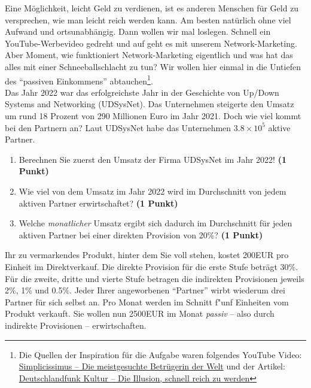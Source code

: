\documentclass[a4paper, 9pt]{scrartcl}\usepackage[]{graphicx}\usepackage[]{xcolor}
\begin{document}
Eine M{\"o}glichkeit, leicht Geld zu verdienen, ist es anderen Menschen f{\"u}r Geld
zu versprechen, wie man leicht reich werden kann. Am besten nat{\"u}rlich ohne
viel Aufwand und ortsunabh{\"a}ngig. Dann wollen wir mal loslegen. Schnell
ein YouTube-Werbevideo gedreht und auf geht es mit unserem
Network-Marketing. Aber Moment, wie funktioniert Network-Marketing
eigentlich und was hat das alles mit einer Schneeballschlacht zu tun? Wir
wollen hier einmal in die Untiefen des "`passiven Einkommens"'
abtauchen\footnote{Die Quellen der Inspiration f{\"u}r die Aufgabe waren
  folgendes YouTube Video:
  \href{https://youtu.be/UOKkZF_qK9M?si=uf4foJVFKfeQMwSw}{Simplicissimus --
    Die meistgesuchte Betr{\"u}gerin der Welt} und der Artikel:
  \href{https://www.deutschlandfunkkultur.de/netzwerk-marketing-die-illusion-schnell-reich-zu-werden-100.html}{
    Deutschlandfunk Kultur -- Die Illusion, schnell reich zu werden}}.\\

Das Jahr 2022 war das erfolgreichste Jahr in der Geschichte von
Up/Down Systems and Networking (UDSysNet). Das Unternehmen steigerte den Umsatz um rund
18 Prozent von 290 Millionen Euro im Jahr
2021. Doch wie viel kommt bei den Partnern an? Laut
UDSysNet habe das Unternehmen \ensuremath{3.8\times 10^{5}} aktive Partner.

\begin{enumerate}
\item Berechnen Sie zuerst den Umsatz der Firma UDSysNet im
  Jahr 2022! \textbf{(1 Punkt)}
\item Wie viel von dem Umsatz im Jahr 2022 wird im Durchschnitt von jedem
  aktiven Partner erwirtschaftet? \textbf{(1 Punkt)}
\item Welche \textit{monatlicher} Umsatz ergibt sich dadurch im
  Durchschnitt f{\"u}r jeden aktiven Partner bei einer direkten Provision von
  20\%? \textbf{(1 Punkt)}
\end{enumerate}

Ihr zu vermarkendes Produkt, hinter dem Sie voll stehen, kostet
200EUR pro Einheit im Direktverkauf. Die direkte Provision
f{\"u}r die erste Stufe betr{\"a}gt 30\%. F{\"u}r die zweite, dritte und
vierte Stufe betragen die indirekten Provisionen jeweils 2\%,
1\% und 0.5\%. Jeder Ihrer angeworbenen "`Partner"'
wirbt wiederum drei Partner f{\"u}r sich selbst an. Pro Monat
werden im Schnitt f{"u}nf Einheiten vom Produkt verkauft. Sie wollen nun
2500EUR im Monat \textit{passiv} -- also durch indirekte
Provisionen -- erwirtschaften.
\end{document}
